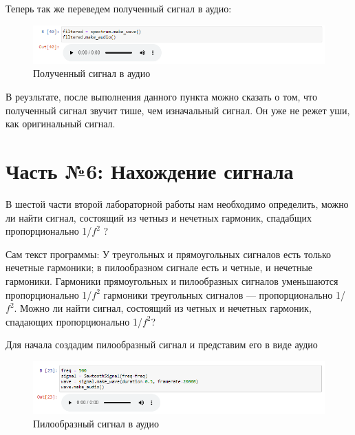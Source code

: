 \documentclass[a4paper]{article}
\begin{document}
           Теперь так же переведем полученный сигнал в аудио:
           
            \begin{figure}[H]
                \centering
                \includegraphics[width=\textwidth]{ex_5_result_signal_audio.png}
                \caption{Полученный сигнал в аудио}
                \label{fig:ex_5_result_signal_audio}
            \end{figure}
           
           В реузльтате, после выполнения данного пункта можно сказать о том, что полученный сигнал звучит тише, чем изначальный сигнал. Он уже не режет уши, как оригинальный сигнал.
           
    \newpage
        \section{Часть №6: Нахождение сигнала}   
            В шестой части второй лабораторной работы нам необходимо определить, можно ли найти сигнал, состоящий из четныз и нечетных гармоник, спадабщих пропорционально 1/$f^2$ ?
            
            Сам текст программы:
            У треугольных и прямоугольных сигналов есть только нечетные гармоники; в пилообразном сигнале есть и четные, и нечетные гармоники. Гармоники прямоугольных и пилообразных сигналов уменьшаются пропорционально 1/$f^2$ гармоники треугольных сигналов — пропорционально 1/$f^2$. Можно ли найти сигнал, состоящий из четных и нечетных гармоник, спадающих пропорционально 1/$f^2$?
            
            Для начала  создадим пилообразный сигнал и представим его в виде аудио
            
             \begin{figure}[H]
                \centering
                \includegraphics[width=\textwidth]{ex_6_sawtooth_signal_audio.png}
                \caption{Пилообразный сигнал в аудио}
                \label{fig:ex_6_sawtooth_signal_audio}
            \end{figure}
            
\end{document}

